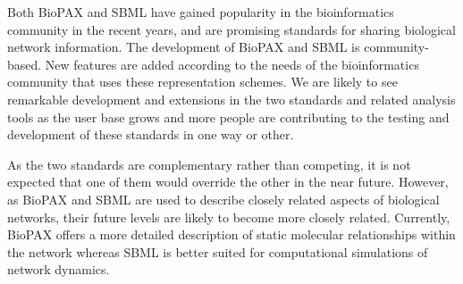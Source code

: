 \documentclass[a4paper,10pt,titlepage]{article}
\begin{document}
Both BioPAX and SBML have gained popularity in the bioinformatics community in the recent years, and are promising standards for sharing biological network information. The development of BioPAX and SBML is community-based. New features are added according to the needs of the bioinformatics community that uses these representation schemes. We are likely to see remarkable development and extensions in the two standards and related analysis tools as the user base grows and more people are contributing to the testing and development of these standards in one way or other. 

As the two standards are complementary rather than competing, it is not expected that one of them would override the other in the near future. However, as BioPAX and SBML are used to describe closely related aspects of biological networks, their future levels are likely to become more closely related. Currently, BioPAX offers a more detailed description of static molecular relationships within the network whereas SBML is better suited for computational simulations of network dynamics.

%
%
%
\end{document}
